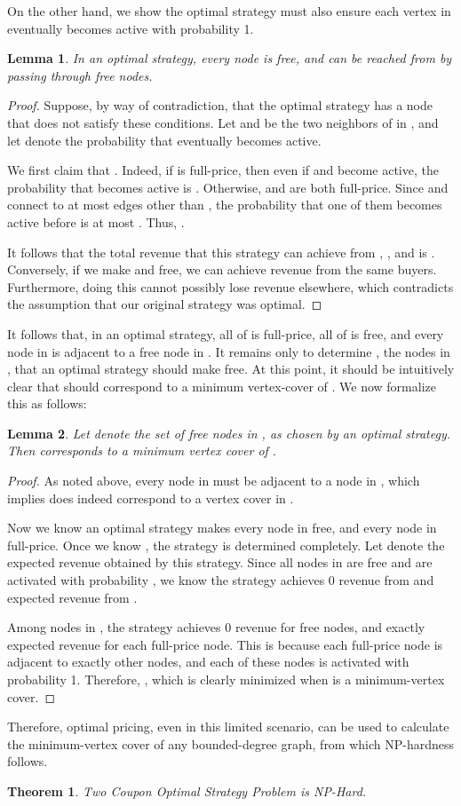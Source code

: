 \documentclass[letterpaper,twoside]{article}
\newtheorem{lemma}{Lemma}
\newtheorem{theorem}{Theorem}
\begin{document}
On the other hand, we show the optimal strategy must also ensure each
vertex in  eventually becomes active with probability 1.
\begin{lemma} \label{lem:v2}
  In an optimal strategy, every node  is free, and can be
  reached from  by passing through free nodes.
\end{lemma}
\begin{proof}
Suppose, by way of contradiction, that the optimal strategy has a node
 that does not satisfy these conditions. Let  and
 be the two neighbors of  in , and let  denote the
probability that  eventually becomes active.

We first claim that . Indeed, if  is full-price, then
even if  and  become active, the probability that 
becomes active is . Otherwise,  and  are
both full-price. Since  and  connect to at most  edges
other than , the probability that one of them becomes active
before  is at most . Thus, .

It follows that the total revenue that this strategy can achieve from
, , and  is . Conversely,
if we make  and  free, we can achieve  revenue from
the same buyers. Furthermore, doing this cannot possibly lose
revenue elsewhere, which contradicts the assumption that our
original strategy was optimal.
\end{proof}

It follows that, in an optimal strategy, all of  is full-price,
all of  is free, and every node in  is adjacent to a free
node in . It remains only to determine , the nodes in ,
that an optimal strategy should make free. At this point, it should be
intuitively clear that  should correspond to a minimum
vertex-cover of . We now formalize this as follows:

\begin{lemma} \label{lem:v1}
    Let  denote the set of free nodes in , as chosen by an
    optimal strategy. Then  corresponds to a minimum vertex cover
    of .
\end{lemma}
\begin{proof}
    As noted above, every node in  must be adjacent to a node
    in , which implies  does indeed correspond to a vertex
    cover in .

    Now we know an optimal strategy makes every node in  free,
    and every node in  full-price. Once we know , the strategy
    is determined completely. Let  denote the expected revenue
    obtained by this strategy. Since all nodes in  are free and
    are activated with probability , we know the strategy achieves
    0 revenue from  and  expected revenue from .

    Among nodes in , the strategy achieves 0 revenue for free
    nodes, and exactly  expected revenue for each
    full-price node. This is because each full-price node is
    adjacent to exactly  other nodes, and each of these nodes
    is activated with probability 1. Therefore,
    , which is clearly
    minimized when  is a minimum-vertex cover.
\end{proof}

Therefore, optimal pricing, even in this limited scenario, can be
used to calculate the minimum-vertex cover of any bounded-degree
graph, from which NP-hardness follows.

\begin{theorem} \label{lem:twocoupon}
  Two Coupon Optimal Strategy Problem is NP-Hard.
\end{theorem}
\end{document}
